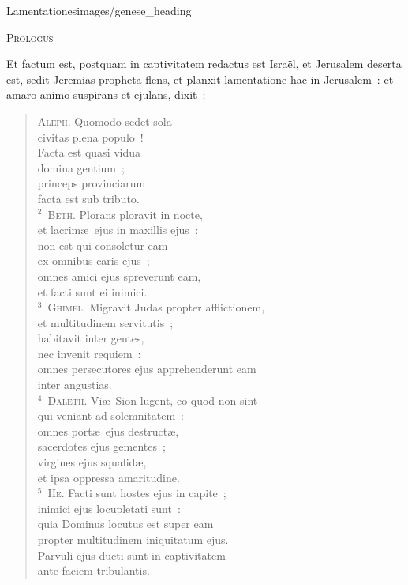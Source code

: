{Lamentationes}{images/genese_heading}

\begin{center}\textsc{Prologus}\end{center}\vspace{-6pt} Et factum est, postquam in captivitatem redactus est Isra\"el, et Jerusalem deserta est, sedit Jeremias propheta flens, et planxit lamentatione hac in Jerusalem~: et amaro animo suspirans et ejulans, dixit~: 

\begin{flushleft}\begin{verse}\vspace{-19pt}\textsc{Aleph.} Quomodo sedet sola\\ civitas plena populo~!\\ Facta est quasi vidua\\ domina gentium~;\\ princeps provinciarum\\ facta est sub tributo.\\
${}^{2}$~\textsc{Beth.} Plorans ploravit in nocte,\\ et lacrim\ae\ ejus in maxillis ejus~:\\ non est qui consoletur eam\\ ex omnibus caris ejus~;\\ omnes amici ejus spreverunt eam,\\ et facti sunt ei inimici.\\
${}^{3}$~\textsc{Ghimel.} Migravit Judas propter afflictionem,\\ et multitudinem servitutis~;\\ habitavit inter gentes,\\ nec invenit requiem~:\\ omnes persecutores ejus apprehenderunt eam\\ inter angustias.\\
${}^{4}$~\textsc{Daleth.} Vi\ae\ Sion lugent, eo quod non sint\\ qui veniant ad solemnitatem~:\\ omnes port\ae\ ejus destruct\ae ,\\ sacerdotes ejus gementes~;\\ virgines ejus squalid\ae ,\\ et ipsa oppressa amaritudine.\\
${}^{5}$~\textsc{He.} Facti sunt hostes ejus in capite~;\\ inimici ejus locupletati sunt~:\\ quia Dominus locutus est super eam\\ propter multitudinem iniquitatum ejus.\\ Parvuli ejus ducti sunt in captivitatem\\ ante faciem tribulantis.\\

\end{verse}
\end{flushleft}
